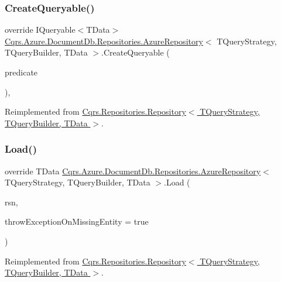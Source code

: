 \subsubsection{\texorpdfstring{Create\+Queryable()}{CreateQueryable()}}
{\footnotesize\ttfamily override I\+Queryable$<$T\+Data$>$ \hyperlink{classCqrs_1_1Azure_1_1DocumentDb_1_1Repositories_1_1AzureRepository}{Cqrs.\+Azure.\+Document\+Db.\+Repositories.\+Azure\+Repository}$<$ T\+Query\+Strategy, T\+Query\+Builder, T\+Data $>$.Create\+Queryable (\begin{DoxyParamCaption}\item[{Expression$<$ Func$<$ T\+Data, bool $>$$>$}]{predicate }\end{DoxyParamCaption})\hspace{0.3cm}{\ttfamily [protected]}, {\ttfamily [virtual]}}



Reimplemented from \hyperlink{classCqrs_1_1Repositories_1_1Repository_ab95fc66b24e8359a1e2f48a3ca2f14c1}{Cqrs.\+Repositories.\+Repository$<$ T\+Query\+Strategy, T\+Query\+Builder, T\+Data $>$}.

\mbox{\label{classCqrs_1_1Azure_1_1DocumentDb_1_1Repositories_1_1AzureRepository_a22c58163e101a6cb80f891bed6114380}} 
\subsubsection{\texorpdfstring{Load()}{Load()}}
{\footnotesize\ttfamily override T\+Data \hyperlink{classCqrs_1_1Azure_1_1DocumentDb_1_1Repositories_1_1AzureRepository}{Cqrs.\+Azure.\+Document\+Db.\+Repositories.\+Azure\+Repository}$<$ T\+Query\+Strategy, T\+Query\+Builder, T\+Data $>$.Load (\begin{DoxyParamCaption}\item[{Guid}]{rsn,  }\item[{bool}]{throw\+Exception\+On\+Missing\+Entity = {\ttfamily true} }\end{DoxyParamCaption})\hspace{0.3cm}{\ttfamily [virtual]}}



Reimplemented from \hyperlink{classCqrs_1_1Repositories_1_1Repository_a444e9dfe4710be90940dbb6dec9d856f}{Cqrs.\+Repositories.\+Repository$<$ T\+Query\+Strategy, T\+Query\+Builder, T\+Data $>$}.

